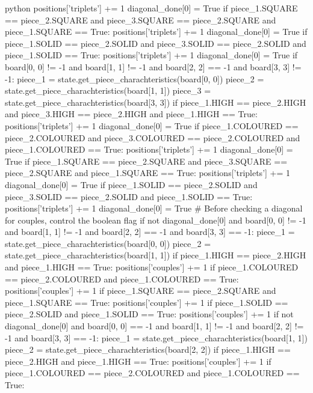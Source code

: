 \begin{mintedbox}{python}
            positions['triplets'] += 1
            diagonal_done[0] = True
        if piece_1.SQUARE == piece_2.SQUARE and piece_3.SQUARE == piece_2.SQUARE and piece_1.SQUARE == True:
            positions['triplets'] += 1
            diagonal_done[0] = True
        if piece_1.SOLID == piece_2.SOLID and piece_3.SOLID == piece_2.SOLID and piece_1.SOLID == True:
            positions['triplets'] += 1
            diagonal_done[0] = True
    if board[0, 0] != -1 and board[1, 1] != -1 and board[2, 2] == -1 and board[3, 3] != -1:
        piece_1 = state.get_piece_charachteristics(board[0, 0])
        piece_2 = state.get_piece_charachteristics(board[1, 1])
        piece_3 = state.get_piece_charachteristics(board[3, 3])
        if piece_1.HIGH == piece_2.HIGH and piece_3.HIGH == piece_2.HIGH and piece_1.HIGH == True:
            positions['triplets'] += 1
            diagonal_done[0] = True
        if piece_1.COLOURED == piece_2.COLOURED and piece_3.COLOURED == piece_2.COLOURED and piece_1.COLOURED == True:
            positions['triplets'] += 1
            diagonal_done[0] = True
        if piece_1.SQUARE == piece_2.SQUARE and piece_3.SQUARE == piece_2.SQUARE and piece_1.SQUARE == True:
            positions['triplets'] += 1
            diagonal_done[0] = True
        if piece_1.SOLID == piece_2.SOLID and piece_3.SOLID == piece_2.SOLID and piece_1.SOLID == True:
            positions['triplets'] += 1
            diagonal_done[0] = True
    # Before checking a diagonal for couples, control the boolean flag
    if not diagonal_done[0] and board[0, 0] != -1 and board[1, 1] != -1 and board[2, 2] == -1 and board[3, 3] == -1:
        piece_1 = state.get_piece_charachteristics(board[0, 0])
        piece_2 = state.get_piece_charachteristics(board[1, 1])
        if piece_1.HIGH == piece_2.HIGH and piece_1.HIGH == True:
            positions['couples'] += 1
        if piece_1.COLOURED == piece_2.COLOURED and piece_1.COLOURED == True:
            positions['couples'] += 1
        if piece_1.SQUARE == piece_2.SQUARE and piece_1.SQUARE == True:
            positions['couples'] += 1
        if piece_1.SOLID == piece_2.SOLID and piece_1.SOLID == True:
            positions['couples'] += 1
    if not diagonal_done[0] and board[0, 0] == -1 and board[1, 1] != -1 and board[2, 2] != -1 and board[3, 3] == -1:
        piece_1 = state.get_piece_charachteristics(board[1, 1])
        piece_2 = state.get_piece_charachteristics(board[2, 2])
        if piece_1.HIGH == piece_2.HIGH and piece_1.HIGH == True:
            positions['couples'] += 1
        if piece_1.COLOURED == piece_2.COLOURED and piece_1.COLOURED == True:

\end{mintedbox}
